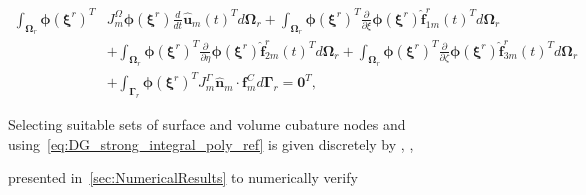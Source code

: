 \documentclass[12pt,Bold,letterpaper,TexShade]{mcgilletdclass}
\numberwithin{equation}{section}
\begin{document}
\begin{equation} \label{eq:DG_strong_integral_poly_ref}
\begin{split}
\int_{\boldsymbol \Omega_r}
\boldsymbol \phi(\boldsymbol \xi^r)^T &
J_m^{\Omega} \boldsymbol \phi(\boldsymbol \xi^r) \frac{d}{dt} \hat{\boldsymbol u}_m(t)^T
d \boldsymbol \Omega_r
+ \int_{\boldsymbol \Omega_r} \boldsymbol \phi(\boldsymbol \xi^r)^T \frac{\partial}{\partial \xi} \boldsymbol \phi(\boldsymbol \xi^r) \hat{\boldsymbol f}^r_{1m}(t)^T d \boldsymbol \Omega_r \\
& + \int_{\boldsymbol \Omega_r} \boldsymbol \phi(\boldsymbol \xi^r)^T \frac{\partial}{\partial \eta} \boldsymbol \phi(\boldsymbol \xi^r) \hat{\boldsymbol f}^r_{2m}(t)^T d \boldsymbol \Omega_r
+ \int_{\boldsymbol \Omega_r} \boldsymbol \phi(\boldsymbol \xi^r)^T \frac{\partial}{\partial \zeta} \boldsymbol \phi(\boldsymbol \xi^r) \hat{\boldsymbol f}^r_{3m}(t)^T d \boldsymbol \Omega_r \\
& + \int_{\boldsymbol \Gamma_r} 
\boldsymbol \phi(\boldsymbol \xi^r)^T 
J_m^{\Gamma} \hat{\boldsymbol n}_m \cdot \boldsymbol f^{C}_m
d \boldsymbol \Gamma_r = \boldsymbol 0^T,
\end{split}
\end{equation}

Selecting suitable sets of surface and volume cubature nodes and using~\eqref{eq:DG_strong_integral_poly_ref} is given discretely by \cite[eq. ({\color{blue}4.24})]{castonguay2012}, \cite[eq. ({\color{blue}23})]{williams2014a},

presented in~\autoref{sec:NumericalResults} to numerically verify
\end{document}
